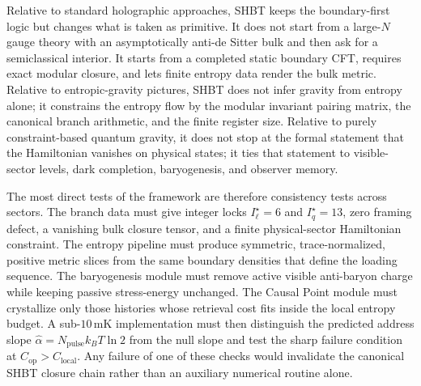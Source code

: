\documentclass[11pt,letterpaper]{article}
\theoremstyle{plain}
\begin{document}
Relative to standard holographic approaches, SHBT keeps the boundary-first
logic but changes what is taken as primitive.  It does not start from a
large-$N$ gauge theory with an asymptotically anti-de Sitter bulk and then ask
for a semiclassical interior.  It starts from a completed static boundary CFT,
requires exact modular closure, and lets finite entropy data render the bulk
metric.  Relative to entropic-gravity pictures, SHBT does not infer gravity
from entropy alone; it constrains the entropy flow by the modular invariant
pairing matrix, the canonical branch arithmetic, and the finite register size.
Relative to purely constraint-based quantum gravity, it does not stop at the
formal statement that the Hamiltonian vanishes on physical states; it ties that
statement to visible-sector levels, dark completion, baryogenesis, and
observer memory.

The most direct tests of the framework are therefore consistency tests across
sectors.  The branch data must give integer locks
$I_{\ell}^{\star}=6$ and $I_q^{\star}=13$, zero framing defect, a vanishing
bulk closure tensor, and a finite physical-sector Hamiltonian constraint.  The
entropy pipeline must produce symmetric, trace-normalized, positive metric
slices from the same boundary densities that define the loading sequence.  The
baryogenesis module must remove active visible anti-baryon charge while keeping
passive stress-energy unchanged.  The Causal Point module must crystallize only
those histories whose retrieval cost fits inside the local entropy budget.  A
sub-\(10\,\mathrm{mK}\) implementation must then distinguish the predicted
address slope \(\widehat\alpha=N_{\text{pulse}}k_BT\ln2\) from the null slope and
test the sharp failure condition at \(C_{\text{op}}>C_{\text{local}}\).  Any
failure of one of these checks would invalidate the canonical SHBT closure
chain rather than an auxiliary numerical routine alone.
\end{document}
